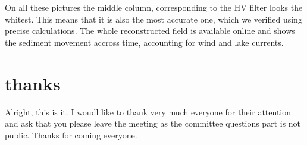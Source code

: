 \documentclass[12pt]{article} %
\begin{document}
On all these pictures the middle column, corresponding to the HV filter looks the whitest. This means that it is also the most accurate one, which we verified using precise calculations. The whole reconstructed field is available online and shows the sediment movement accross time, accounting for wind and lake currents.


\newpage
\section*{thanks}


Alright, this is it. I woudl like to thank very much everyone for their attention and ask that you please leave the meeting as the committee questions part is not public. Thanks for coming everyone. 
\end{document}
